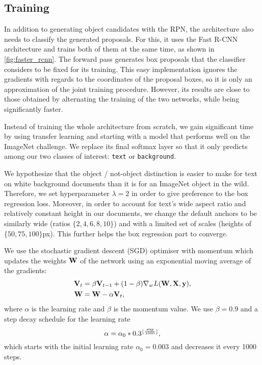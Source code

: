 
	\subsection{Training}\label{sec:frcnn_train}
		In addition to generating object candidates with the RPN, the \FRCNN{} architecture also needs to classify the generated proposals. For this, it uses the Fast R-CNN architecture and trains both of them at the same time, as shown in \autoref{fig:faster_rcnn}. The forward pass generates box proposals that the classifier considers to be fixed for its training. This easy implementation ignores the gradients with regards to the coordinates of the proposal boxes, so it is only an approximation of the joint training procedure. However, its results are close to those obtained by alternating the training of the two networks, while being significantly faster.

		Instead of training the whole architecture from scratch, we gain significant time by using transfer learning and starting with a model that performs well on the ImageNet challenge. We replace its final softmax layer so that it only predicts among our two classes of interest: \texttt{text} or \texttt{background}.

		We hypothesize that the object / not-object distinction is easier to make for text on white background documents than it is for an ImageNet object in the wild. Therefore, we set hyperparameter \(\lambda = 2\) in order to give preference to the box regression loss. Moreover, in order to account for text's wide aspect ratio and relatively constant height in our documents, we change the default anchors to be similarly wide (ratios \(\{2, 4, 6, 8, 10\}\)) and with a limited set of scales (heights of \(\{50, 75, 100\}\)px). This further helps the box regression part to converge.

		We use the stochastic gradient descent (SGD) optimiser with momentum which updates the weights \(\mathbf{W}\) of the network using an exponential moving average of the gradients:\[
		\begin{split}
			\mathbf{V}_t &= \beta \mathbf{V}_{t-1} + (1-\beta) \nabla_w L (\mathbf{W}, \mathbf{X}, \mathbf{y}),\\
			\mathbf{W} &= \mathbf{W} - \alpha \mathbf{V}_t,
		\end{split}
		\]
		where \(\alpha\) is the learning rate and \(\beta\) is the momentum value. We use \(\beta = 0.9\) and a step decay schedule for the learning rate \[
			\alpha = \alpha_0 * 0.3 ^ {\lfloor\frac{\mathit{step}}{1000}\rfloor},
		\]
		which starts with the initial learning rate \(\alpha_0 = 0.003\) and decreases it every 1000 steps.


